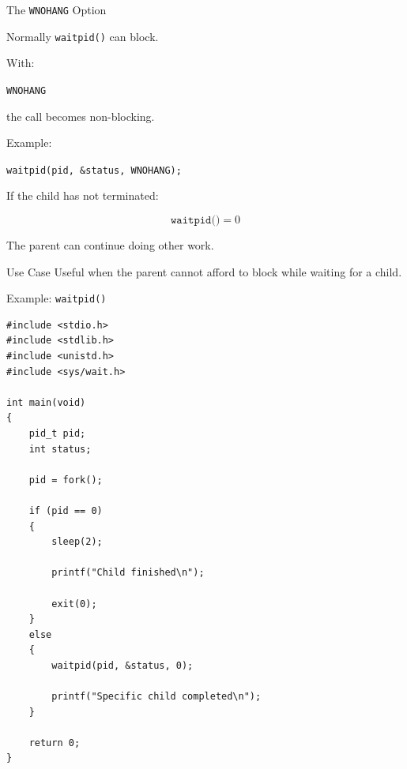 \documentclass[aspectratio=169]{beamer}
\begin{document}
\begin{frame}{The \texttt{WNOHANG} Option}

Normally \texttt{waitpid()} can block.

With:

\begin{center}
\texttt{WNOHANG}
\end{center}

the call becomes non-blocking.

Example:

\begin{center}
\texttt{waitpid(pid, \&status, WNOHANG);}
\end{center}

If the child has not terminated:

\[
\texttt{waitpid()} = 0
\]

The parent can continue doing other work.

\begin{block}{Use Case}
Useful when the parent cannot afford to block while waiting for a child.
\end{block}

\end{frame}

\begin{frame}[fragile]{Example: \texttt{waitpid()}}

\begin{lstlisting}[style=cstyle]
#include <stdio.h>
#include <stdlib.h>
#include <unistd.h>
#include <sys/wait.h>

int main(void)
{
    pid_t pid;
    int status;

    pid = fork();

    if (pid == 0)
    {
        sleep(2);

        printf("Child finished\n");

        exit(0);
    }
    else
    {
        waitpid(pid, &status, 0);

        printf("Specific child completed\n");
    }

    return 0;
}
\end{lstlisting}

\end{frame}
\end{document}
